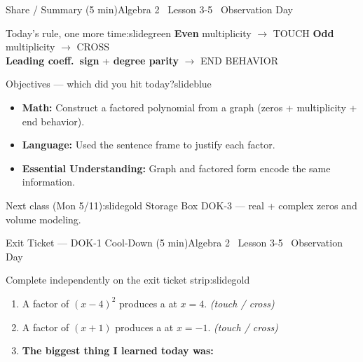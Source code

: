 \documentclass[aspectratio=169, 11pt]{beamer}
\begin{document}
\begin{frame}{Share / Summary (5 min)}{Algebra 2 \textperiodcentered\ Lesson 3-5 \textperiodcentered\ Observation Day}
\vspace{0.15cm}
\begin{projcard}{Today's rule, one more time:}{slidegreen}
\textbf{Even} multiplicity $\rightarrow$ TOUCH \quad\textbf{Odd} multiplicity $\rightarrow$ CROSS\\
\textbf{Leading coeff.\ sign} + \textbf{degree parity} $\rightarrow$ END BEHAVIOR
\end{projcard}
\vspace{0.1cm}
\begin{projcard}{Objectives --- which did you hit today?}{slideblue}
\begin{itemize}
  \setlength{\itemsep}{0.1cm}
  \item[$\square$] \textbf{Math:} Construct a factored polynomial from a graph (zeros + multiplicity + end behavior).
  \item[$\square$] \textbf{Language:} Used the sentence frame to justify each factor.
  \item[$\square$] \textbf{Essential Understanding:} Graph and factored form encode the same information.
\end{itemize}
\end{projcard}
\vspace{0.1cm}
\begin{projcard}{Next class (Mon 5/11):}{slidegold}
Storage Box DOK-3 --- real + complex zeros and volume modeling.
\end{projcard}
\end{frame}

\begin{frame}{Exit Ticket --- DOK-1 Cool-Down (5 min)}{Algebra 2 \textperiodcentered\ Lesson 3-5 \textperiodcentered\ Observation Day}
\vspace{0.2cm}
\begin{projcard}{Complete independently on the exit ticket strip:}{slidegold}
\begin{enumerate}
  \setlength{\itemsep}{0.35cm}
  \item A factor of $(x-4)^2$ produces a \underline{\hspace{2cm}} at $x = 4$.
        \hfill\textit{\small (touch / cross)}
  \item A factor of $(x+1)$ produces a \underline{\hspace{2cm}} at $x = -1$.
        \hfill\textit{\small (touch / cross)}
  \item \textbf{The biggest thing I learned today was:}
        \underline{\hspace{4.5cm}}
\end{enumerate}
\end{projcard}
\end{frame}
\end{document}
